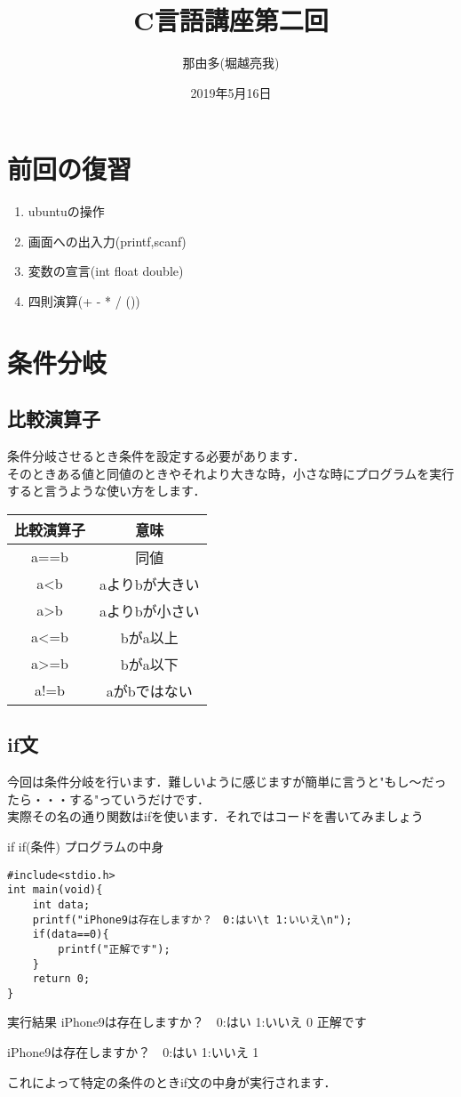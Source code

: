 \documentclass[a4j,titlepage,dvipdfmx]{jsarticle}   %
\title{C言語講座第二回}
\author{那由多(堀越亮我)}
\date{2019年5月16日}
\begin{document}
\maketitle
\section{前回の復習}
\begin{enumerate}
\item ubuntuの操作
\item 画面への出入力(printf,scanf)
\item 変数の宣言(int float double)
\item 四則演算(+ - * / ())
\end{enumerate}
\section{条件分岐}
\subsection{比較演算子}
条件分岐させるとき条件を設定する必要があります．\\
そのときある値と同値のときやそれより大きな時，小さな時にプログラムを実行すると言うような使い方をします．
\begin{table}[h]
\begin{tabular}{|c|c|}
\hline
比較演算子 & 意味 \\ \hline
a==b & 同値 \\ \hline
a\textless{}b & aよりbが大きい \\ \hline
a\textgreater{}b & aよりbが小さい \\ \hline
a\textless{}=b & bがa以上 \\ \hline
a\textgreater{}=b & bがa以下 \\ \hline
a!=b & aがbではない \\ \hline
\end{tabular}
\end{table}
\subsection{if文}
今回は条件分岐を行います．難しいように感じますが簡単に言うと"もし〜だったら・・・する"っていうだけです．\\
実際その名の通り関数はifを使います．それではコードを書いてみましょう
\begin{itembox}{if}
if(条件){
	プログラムの中身
}
\end{itembox}
\begin{lstlisting}
#include<stdio.h>
int main(void){
	int data;
    printf("iPhone9は存在しますか？　0:はい\t 1:いいえ\n");
    if(data==0){
    	printf("正解です");
    }
    return 0;
}
\end{lstlisting}
\begin{itembox}{実行結果}
iPhone9は存在しますか？　0:はい      1:いいえ
0
正解です

iPhone9は存在しますか？　0:はい      1:いいえ
1
\end{itembox}
これによって特定の条件のときif文の中身が実行されます．
\end{document}

